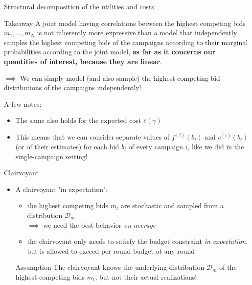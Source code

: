 \begin{frame}{Structural decomposition of the utilities and costs}
    \begin{alertblock}{Takeaway}
        A joint model having correlations between the highest competing bids $m_1,\ldots,m_N$ is not inherently more expressive than a model that independently samples the highest competing bids of the campaigns according to their marginal probabilities according to the joint model, \textbf{as far as it concerns our quantities of interest, because they are linear}.
    \end{alertblock}

    $\implies$ We can simply model (and also sample) the highest-competing-bid distributions of the campaigns independently!

    \vspace{0.5cm}
    
    A few notes:
    \begin{itemize}
        \item The same also holds for the expected cost $\bar{c}(\gamma)$ 
        \item This means that we can consider separate values of $f^{(i)}(b_i)$ and $c^{(i)}(b_i)$ (or of their estimates) for each bid $b_i$ of every campaign $i$, like we did in the single-campaign setting!
    \end{itemize}
\end{frame}

\begin{frame}{Clairvoyant}
    \begin{itemize}
        \item A clairvoyant "in expectation":
        \begin{itemize}
            \item the highest competing bids $m_t$ are stochastic and sampled from a distribution $\mathcal{D}_m$ \\
            $\implies$ we need the best behavior \emph{on average}
            \item the clairvoyant only needs to satisfy the budget constraint \emph{in expectation}, but is allowed to exceed per-round budget at any round
        \end{itemize}
        
        \begin{block}{Assumption} 
        The clairvoyant knows the underlying distribution $\mathcal{D}_m$ of the highest competing bids $m_t$, but not their actual realizations!
        \end{block}
    \end{itemize}
\end{frame}

